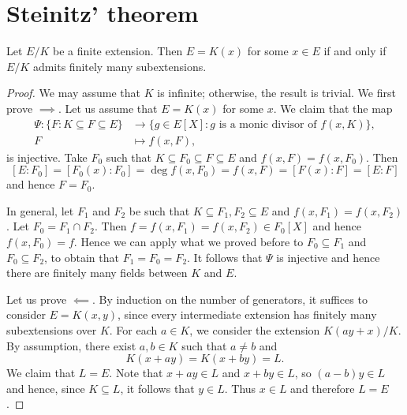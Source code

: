 \section{Steinitz' theorem}
\lecture\label{section:Steinitz}

\begin{theorem}[Steinitz]
    Let $E/K$ be a finite extension. Then $E=K(x)$ for some $x\in E$ 
    if and only if $E/K$ admits finitely many subextensions. 
\end{theorem}

\begin{proof}
     We may assume that $K$ is infinite; otherwise, the result is trivial. 
    We first prove $\implies$. 
    Let us 
    assume that $E=K(x)$ for some $x$. We claim that the map
    \begin{align*}
    \Psi\colon \{F:K\subseteq F\subseteq E\}&\to\{g\in E[X]:g\text{ is a monic divisor of $f(x,K)$}\},\\
    F&\mapsto f(x,F),
    \end{align*}
    is injective. 
    Take $F_0$ such that $K\subseteq F_0\subseteq F\subseteq E$ and  
    $f(x,F)=f(x,F_0)$. Then  
    \[
    [E:F_0]=[F_0(x):F_0]=\deg f(x,F_0)=f(x,F)=[F(x):F]=[E:F]
    \]
    and hence $F=F_0$.
    
    In general, let  $F_1$ and $F_2$ be such that 
    $K\subseteq F_1,F_2\subseteq E$ and $f(x,F_1)=f(x,F_2)$.
    Let $F_0=F_1\cap F_2$. 
    Then $f=f(x,F_1)=f(x,F_2)\in F_0[X]$ and hence $f(x,F_0)=f$.
    Hence we can apply what we proved before to $F_0\subseteq F_1$
    and $F_0\subseteq F_2$, to obtain that $F_1=F_0=F_2$.
    It follows that $\Psi$ is injective 
    and hence there are finitely many fields between $K$ and $E$. 
    
    Let us prove $\impliedby$.  
    By induction on the number of generators, it suffices to consider $E=K(x,y)$, since every intermediate extension has finitely many subextensions over $K$.
    For each $a\in K$, we consider
    the extension $K(ay+x)/K$. By assumption, there exist $a,b\in K$ such that
    $a\ne b$ and 
    \[
    K(x+ay)=K(x+by)=L.
    \]
    We claim that $L=E$. Note that 
    $x+ay\in L$ and $x+by\in L$, so $(a-b)y\in L$ and hence, since $K\subseteq L$, it follows that
    $y\in L$. Thus $x\in L$ and therefore $L=E$. 
\end{proof}

